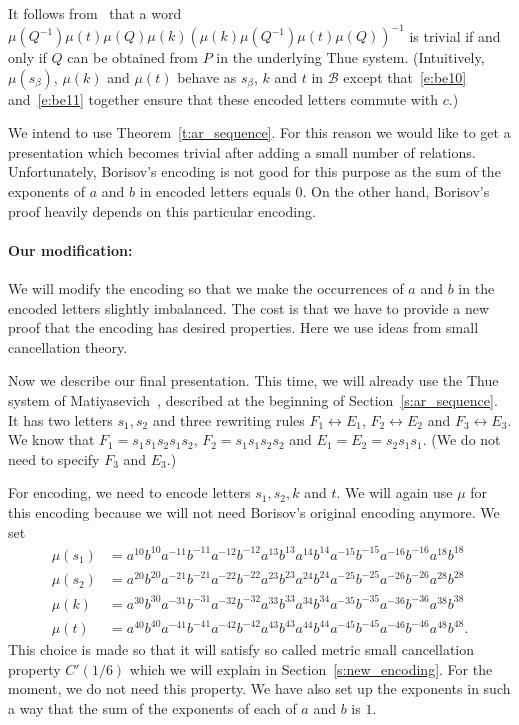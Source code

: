 \documentclass[10pt,a4paper]{article}
\theoremstyle{definition}
\theoremstyle{remark}
\newcommand\BB{\mathcal{B}}
\begin{document}
It follows from~\cite[Theorem~2]{borisov69} that a word
$\mu(Q^{-1})\mu(t)\mu(Q)\mu(k)(\mu(k)\mu(Q^{-1})\mu(t)\mu(Q))^{-1}$ is trivial
if and only if $Q$ can be obtained from $P$ in the underlying Thue system.
(Intuitively, $\mu(s_\beta)$, $\mu(k)$ and $\mu(t)$ behave as $s_\beta$, $k$
and $t$ in $\BB$ except that~\eqref{e:be10} and~\eqref{e:be11} together ensure
that these encoded letters commute with $c$.)

We intend to use Theorem~\ref{t:ar_sequence}. For this reason we would like to
get a presentation which becomes trivial after adding a small number of
relations. Unfortunately, Borisov's encoding is not good for this purpose as
the sum of the exponents of $a$ and $b$ in encoded letters equals $0$. On the
other hand, Borisov's proof heavily depends on this particular encoding. 


\paragraph{Our modification:} We will modify the encoding so that we make the
occurrences of $a$ and $b$ in the encoded letters slightly imbalanced. The
cost is that we have to provide a new proof that the encoding has desired
properties. Here we use ideas from small cancellation theory. 

Now we describe our final presentation. This time, we will already use the Thue
system of Matiyasevich~\cite{matiyasevich67}, described at the beginning of
Section~\ref{s:ar_sequence}. It has two letters $s_1, s_2$ and three rewriting
rules $F_1 \leftrightarrow
E_1$, $F_2 \leftrightarrow E_2$ and $F_3 \leftrightarrow E_3$. We know that
$F_1 = s_1s_1s_2s_1s_2$, $F_2 = s_1s_1s_2s_2$ and $E_1 = E_2 = s_2s_1s_1$. (We
do not need to specify $F_3$ and $E_3$.)

For encoding, we need to encode letters $s_1, s_2, k$ and $t$. We will again
use $\mu$ for this encoding because we will not need Borisov's original
encoding anymore. We set
\begin{align}
  \mu(s_1) &=
  a^{10}b^{10}a^{-11}b^{-11}a^{-12}b^{-12}a^{13}b^{13}a^{14}b^{14}a^{-15}b^{-15}a^{-16}b^{-16}a^{18}b^{18}
  \label{e:enc_s1} \\
  \mu(s_2) &=  
  a^{20}b^{20}a^{-21}b^{-21}a^{-22}b^{-22}a^{23}b^{23}a^{24}b^{24}a^{-25}b^{-25}
  a^{-26}b^{-26}a^{28}b^{28}\\
  \mu(k) &=  
  a^{30}b^{30}a^{-31}b^{-31}a^{-32}b^{-32}a^{33}b^{33}a^{34}b^{34}a^{-35}b^{-35}
  a^{-36}b^{-36}a^{38}b^{38}\\
  \mu(t) &=  
  a^{40}b^{40}a^{-41}b^{-41}a^{-42}b^{-42}a^{43}b^{43}a^{44}b^{44}a^{-45}b^{-45}a^{-46}b^{-46}a^{48}b^{48}.
  \label{e:enc_t}
\end{align}
This choice is made so that it will satisfy so called metric small cancellation
property $C'(1/6)$ which we will explain in Section~\ref{s:new_encoding}. 
For the moment, we do not need this property. We have also set up the exponents in
such a way that the sum of the exponents of each of $a$ and $b$ is $1$.
\end{document}
